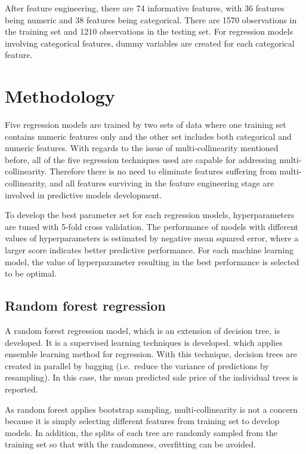 \documentclass[letterpaper,12pt,twoside,]{pinp}
\begin{document}
After feature engineering, there are 74 informative features, with 36
features being numeric and 38 features being categorical. There are 1570
observations in the training set and 1210 observations in the testing
set. For regression models involving categorical features, dummy
variables are created for each categorical feature.

\hypertarget{methodology}{%
\section{Methodology}\label{methodology}}

Five regression models are trained by two sets of data where one
training set contains numeric features only and the other set includes
both categorical and numeric features. With regards to the issue of
multi-collinearity mentioned before, all of the five regression
techniques used are capable for addressing multi-collinearity. Therefore
there is no need to eliminate features suffering from
multi-collinearity, and all features surviving in the feature
engineering stage are involved in predictive models development.

To develop the best parameter set for each regression models,
hyperparameters are tuned with 5-fold cross validation. The performance
of models with different values of hyperparameters is estimated by
negative mean squared error, where a larger score indicates better
predictive performance. For each machine learning model, the value of
hyperparameter resulting in the best performance is selected to be
optimal.

\hypertarget{random-forest-regression}{%
\subsection{Random forest regression}\label{random-forest-regression}}

A random forest regression model, which is an extension of decision
tree, is developed. It is a supervised learning techniques is developed.
which applies ensemble learning method for regression. With this
technique, decision trees are created in parallel by bagging
(i.e.~reduce the variance of predictions by resampling). In this case,
the mean predicted sale price of the individual trees is reported.

As random forest applies bootstrap sampling, multi-collinearity is not a
concern because it is simply selecting different features from training
set to develop models. In addition, the splits of each tree are randomly
sampled from the training set so that with the randomness, overfitting
can be avoided.
\end{document}

